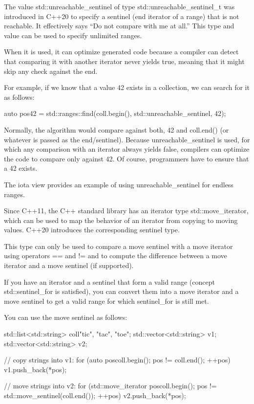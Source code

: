
The value std::unreachable\_sentinel of type std::unreachable\_sentinel\_t was introduced in C++20 to specify a sentinel (end iterator of a range) that is not reachable. It effectively says “Do not compare with me at all.” This type and value can be used to specify unlimited ranges.

When it is used, it can optimize generated code because a compiler can detect that comparing it with another iterator never yields true, meaning that it might skip any check against the end.

For example, if we know that a value 42 exists in a collection, we can search for it as follows:

\begin{cpp}
auto pos42 = std::ranges::find(coll.begin(), std::unreachable_sentinel,
					42);
\end{cpp}

Normally, the algorithm would compare against both, 42 and coll.end() (or whatever is passed as the end/sentinel). Because unreachable\_sentinel is used, for which any comparison with an iterator always yields false, compilers can optimize the code to compare only against 42. Of course, programmers have to ensure that a 42 exists.

The iota view provides an example of using unreachable\_sentinel for endless ranges.


Since C++11, the C++ standard library has an iterator type std::move\_iterator, which can be used to map the behavior of an iterator from copying to moving values. C++20 introduces the corresponding sentinel type.

This type can only be used to compare a move sentinel with a move iterator using operators == and != and to compute the difference between a move iterator and a move sentinel (if supported).

If you have an iterator and a sentinel that form a valid range (concept std::sentinel\_for is satisfied), you can convert them into a move iterator and a move sentinel to get a valid range for which sentinel\_for is still met.

You can use the move sentinel as follows:

\begin{cpp}
std::list<std::string> coll{"tic", "tac", "toe"};
std::vector<std::string> v1;
std::vector<std::string> v2;

// copy strings into v1:
for (auto pos{coll.begin()}; pos != coll.end(); ++pos) {
	v1.push_back(*pos);
}

// move strings into v2:
for (std::move_iterator pos{coll.begin()};
pos != std::move_sentinel(coll.end()); ++pos) {
	v2.push_back(*pos);
}
\end{cpp}

